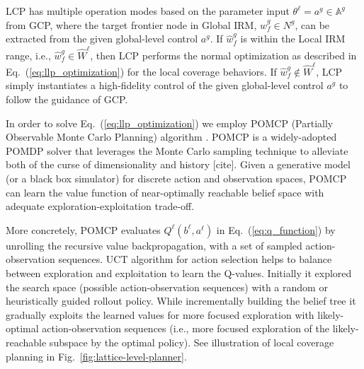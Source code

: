 \documentclass[letterpaper]{article} %
\newcommand{\phdone}[1]{} %
\begin{document}
\phdone{LCP Problem Characteristics}
LCP has multiple operation modes based on the parameter input $\theta^\ell = a^g \in \mathbb{A}^g$ from GCP,
where the target frontier node in Global IRM, $\hat{w}^g_f \in N^g$, can be extracted from the given global-level control $a^g$.
%
If $\hat{w}^g_f$ is within the Local IRM range, i.e., $\hat{w}^g_f \in \hat{W}^\ell$, then LCP performs the normal optimization as described in Eq.~(\ref{eq:llp_optimization}) for the local coverage behaviors.
If $\hat{w}^g_f \notin \hat{W}^\ell$, LCP simply instantiates a high-fidelity control of the given global-level control $a^g$ to follow the guidance of GCP.





\phdone{POMDP Solver LCP}
In order to solve Eq.~(\ref{eq:llp_optimization}) we employ POMCP (Partially Observable Monte Carlo Planning) algorithm \cite{silver2010monte}.
POMCP is a widely-adopted POMDP solver that leverages the Monte Carlo sampling technique to alleviate both of the curse of dimensionality and history [cite].
Given a generative model (or a black box simulator) for discrete action and observation spaces, POMCP can learn the value function of near-optimally reachable belief space with adequate exploration-exploitation trade-off.


\phdone{POMCP Details}
More concretely, POMCP evaluates $Q^\ell(b^\ell, a^\ell)$ in Eq.~(\ref{eq:q_function}) by unrolling the recursive value backpropagation, with a set of sampled action-observation sequences.
UCT algorithm for action selection helps to balance between exploration and exploitation to learn the Q-values.
Initially it explored the search space (possible action-observation sequences) with a random or heuristically guided rollout policy.
While incrementally building the belief tree it gradually exploits the learned values for more focused exploration with likely-optimal action-observation sequences (i.e., more focused exploration of the likely-reachable subspace by the optimal policy).
See illustration of local coverage planning in Fig.~\ref{fig:lattice-level-planner}.
\end{document}
